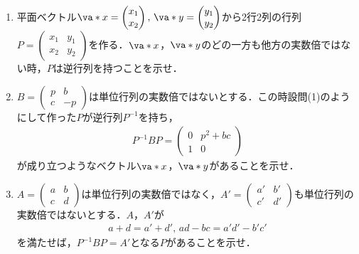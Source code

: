 \begin{enumerate}
  \item 平面ベクトル$\va*{x}=\begin{pmatrix}x_1\\x_2\end{pmatrix},\,\va*{y}=\begin{pmatrix}y_1\\y_2\end{pmatrix}$から2行2列の行列$P=\begin{pmatrix} x_1&y_1 \\ x_2&y_2\end{pmatrix}$を作る．$\va*{x}$，$\va*{y}$のどの一方も他方の実数倍ではない時，$P$は逆行列を持つことを示せ．
  \item $B=\begin{pmatrix} p&b \\ c&-p\end{pmatrix}$は単位行列の実数倍ではないとする．この時設問(1)のようにして作った$P$が逆行列$P^{-1}$を持ち，
        \begin{align*}
          P^{-1}BP=
          \begin{pmatrix}
            0 & p^2+bc \\
            1 & 0
          \end{pmatrix}
        \end{align*}
        が成り立つようなベクトル$\va*{x}$，$\va*{y}$があることを示せ．
  \item $A=\begin{pmatrix} a&b \\ c&d\end{pmatrix}$は単位行列の実数倍ではなく，$A'=\begin{pmatrix} a'&b' \\ c'&d' \end{pmatrix}$も単位行列の実数倍ではないとする．$A$，$A'$が
        \begin{align*}
          a+d=a'+d',\, ad-bc=a'd'-b'c'
        \end{align*}
        を満たせば，$P^{-1}BP=A'$となる$P$があることを示せ．
\end{enumerate}